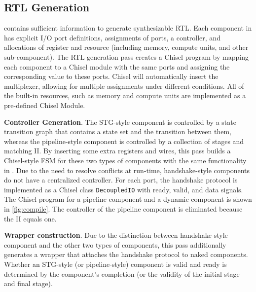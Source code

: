 \subsection{RTL Generation}
\label{sec:rtl}
\hec contains sufficient information to generate synthesizable RTL. Each component in \hec has explicit I/O port definitions, assignments of ports, a controller, and allocations of register and resource (including memory, compute units, and other sub-component). The RTL generation pass creates a Chisel \cite{chisel} program by mapping each component to a Chisel module with the same ports and assigning the corresponding value to these ports. Chisel will automatically insert the multiplexer, allowing for multiple assignments under different conditions. All of the built-in resources, such as memory and compute units are implemented as a pre-defined Chisel Module. 

\textbf{Controller Generation}. The STG-style component is controlled by a state transition graph that contains a state set and the transition between them, whereas the pipeline-style component is controlled by a collection of stages and matching II. By inserting some extra registers and wires, this pass builds a Chisel-style FSM for these two types of components with the same functionality in \tor. Due to the need to resolve conflicts at run-time, handshake-style components do not have a centralized controller. For each port, the handshake protocol is implemented as a Chisel class \texttt{DecoupledIO} with ready, valid, and data signals. The Chisel program for a pipeline component and a dynamic component is shown in \autoref{fig:compile}. The controller of the pipeline component is eliminated because the II equals one.

\textbf{Wrapper construction}. Due to the distinction between handshake-style component and the other two types of components, this pass additionally generates a wrapper that attaches the handshake protocol to naked components. Whether an STG-style (or pipeline-style) component is valid and ready is determined by the component's completion (or the validity of the initial stage and final stage).